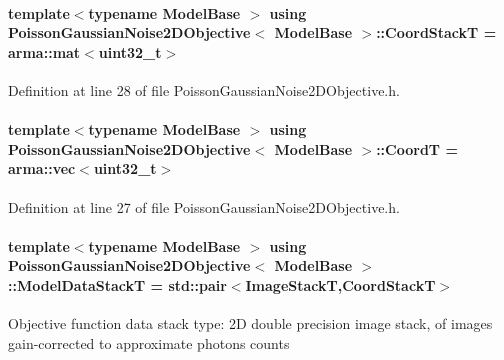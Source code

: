 \paragraph[{\texorpdfstring{Coord\+StackT}{CoordStackT}}]{\setlength{\rightskip}{0pt plus 5cm}template$<$typename Model\+Base $>$ using {\bf Poisson\+Gaussian\+Noise2\+D\+Objective}$<$ Model\+Base $>$\+::{\bf Coord\+StackT} =  arma\+::mat$<$uint32\+\_\+t$>$}\hypertarget{classPoissonGaussianNoise2DObjective_a5842f130c58c7f50fe2e44a76f6981a9}{}\label{classPoissonGaussianNoise2DObjective_a5842f130c58c7f50fe2e44a76f6981a9}


Definition at line 28 of file Poisson\+Gaussian\+Noise2\+D\+Objective.\+h.

\paragraph[{\texorpdfstring{CoordT}{CoordT}}]{\setlength{\rightskip}{0pt plus 5cm}template$<$typename Model\+Base $>$ using {\bf Poisson\+Gaussian\+Noise2\+D\+Objective}$<$ Model\+Base $>$\+::{\bf CoordT} =  arma\+::vec$<$uint32\+\_\+t$>$}\hypertarget{classPoissonGaussianNoise2DObjective_a4869a86fc5712492b479c26b4d808e38}{}\label{classPoissonGaussianNoise2DObjective_a4869a86fc5712492b479c26b4d808e38}


Definition at line 27 of file Poisson\+Gaussian\+Noise2\+D\+Objective.\+h.

\paragraph[{\texorpdfstring{Model\+Data\+StackT}{ModelDataStackT}}]{\setlength{\rightskip}{0pt plus 5cm}template$<$typename Model\+Base $>$ using {\bf Poisson\+Gaussian\+Noise2\+D\+Objective}$<$ Model\+Base $>$\+::{\bf Model\+Data\+StackT} =  std\+::pair$<$Image\+StackT,{\bf Coord\+StackT}$>$}\hypertarget{classPoissonGaussianNoise2DObjective_af88ce9c09fc860efefeba5569fbd5ac1}{}\label{classPoissonGaussianNoise2DObjective_af88ce9c09fc860efefeba5569fbd5ac1}
Objective function data stack type\+: 2D double precision image stack, of images gain-\/corrected to approximate photons counts 


